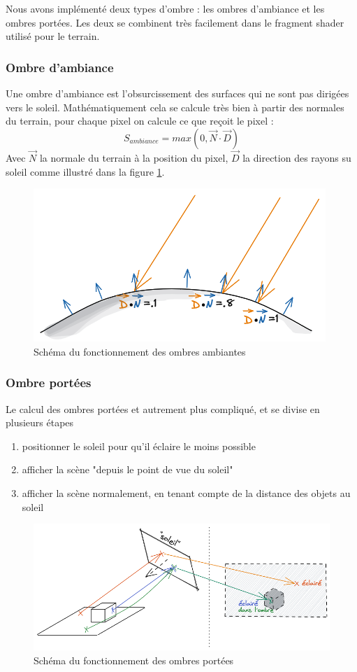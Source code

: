 \documentclass[11pt]{article} %
\begin{document}
Nous avons implémenté deux types d'ombre : les ombres d'ambiance et les ombres portées. Les deux se combinent très facilement dans le fragment shader utilisé pour le terrain.
\subsubsection{Ombre d'ambiance}
Une ombre d'ambiance est l'obsurcissement des surfaces qui ne sont pas dirigées vers le soleil. Mathématiquement cela se calcule très bien à partir des normales du terrain, pour chaque pixel on calcule ce que reçoit le pixel :
$$ S_{ambiance}=max(0, \vec{N}\cdot \vec{D}) $$
Avec $\vec{N}$ la normale du terrain à la position du pixel, $\vec{D}$ la direction des rayons su soleil comme illustré dans la figure \ref{fig:ambiant_shadows_schema}.

\begin{figure}[h]
	\centering
	\includegraphics[scale=.49]{ombres_ambiantes}
	\caption{Schéma du fonctionnement des ombres ambiantes}
	\label{fig:ambiant_shadows_schema}
\end{figure}

\subsubsection{Ombre portées}
Le calcul des ombres portées et autrement plus compliqué, et se divise en plusieurs étapes
\begin{enumerate}
\itemsep-.5em
\item positionner le soleil pour qu'il éclaire le moins possible
\item afficher la scène "depuis le point de vue du soleil"
\item afficher la scène normalement, en tenant compte de la distance des objets au soleil
\end{enumerate}

\begin{figure}[h]
	\centering
	\includegraphics[scale=.49]{ombres}
	\caption{Schéma du fonctionnement des ombres portées}
	\label{fig:shadows_schema}
\end{figure}
\end{document}
